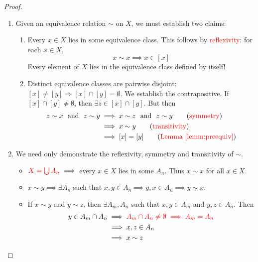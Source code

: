 \begin{proof}
	\begin{enumerate}
		\item Given an equivalence relation $\sim$ on $X$, we must establish two claims:
		\begin{enumerate}
	  	\item Every $x\in X$ lies in some equivalence class. This follows by \textcolor{red}{reflexivity}: for each $x\in X$,
	  	\[
	  		x\sim x\implies x\in [x]
	  	\]
	  	Every element of $X$ lies in the equivalence class defined by itself!
	  	
	  	\item Distinct equivalence classes are pairwise disjoint: $[x]\neq[y]\Longrightarrow [x]\cap[y]=\emptyset$. We establish the contrapositive. If $[x]\cap [y]\neq\emptyset$, then $\exists z\in [x]\cap [y]$. But then
			\begin{align*}
				z\sim x\ \text{ and }\ z\sim y
				&\implies x\sim z\ \text{ and }\ z\sim y \tag{\textcolor{red}{symmetry}}\\
				&\implies x\sim y \tag{\textcolor{red}{transitivity}}\\
				&\implies [x]=[y] \tag{\textcolor{red}{Lemma \ref{lemm:preequiv}}}
			\end{align*}
		\end{enumerate}
		
		\item We need only demonstrate the reflexivity, symmetry and transitivity of $\sim$.
		\begin{itemize}
			\item[] $\textcolor{red}{X=\bigcup A_n}\implies$ every $x\in X$ lies in some $A_n$. Thus $x\sim x$ for all $x\in X$.
			\item[]\eqsymm $x\sim y \implies \exists A_n$ such that $x,y\in A_n \implies y,x\in A_n\implies y\sim x$.
			\item[]\eqtrans If $x\sim y$ and $y\sim z$, then $\exists A_m,A_n$ such that $x,y\in A_m$ and $y,z\in A_n$. Then
			\begin{align*}
				y\in A_m\cap A_n 
				&\implies \textcolor{red}{A_m\cap A_n\neq\emptyset\implies A_m=A_n}\\
				&\implies x,z\in A_n\\
				&\implies x\sim z \tag*{\qedhere}
			\end{align*}
		\end{itemize}
	\end{enumerate}
\end{proof}



